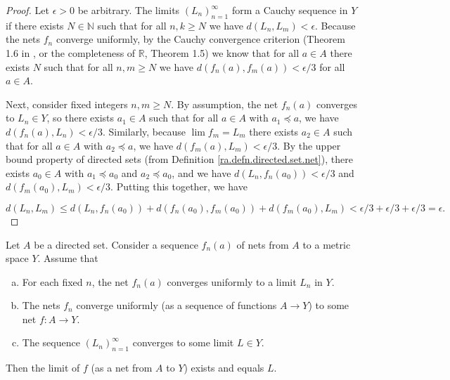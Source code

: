 \begin{proof}

Let \(\epsilon >0\) be arbitrary. The limits \((L_n)_{n=1}^\infty\) form a Cauchy sequence in \(Y\) if there exists \(N \in \mathbb{N}\) such that for all \(n, k \geq N\) we have \(d(L_n, L_m) < \epsilon\). Because the nets \(f_n\) converge uniformly, by the Cauchy convergence criterion (Theorem 1.6 in \citet{pugh2015real}, or the completeness of \(\mathbb{R}\), Theorem 1.5) we know that for all \(a \in A\) there exists \(N\) such that for all \(n, m \geq N\) we have \(d(f_n(a), f_m(a)) < \epsilon/3\) for all \(a \in A\).

Next, consider fixed integers \(n, m \geq N\). By assumption, the net \(f_n(a)\) converges to \(L_n \in Y\), so there exists \(a_1 \in A\) such that for all \(a \in A\) with \(a_1 \preceq a\), we have \(d(f_n(a), L_n) < \epsilon/3\). Similarly, because \(\lim f_m = L_m\) there exists \(a_2 \in A\) such that for all \(a \in A\) with \(a_2 \preceq a\), we have \(d(f_m(a), L_m) < \epsilon/3\). By the upper bound property of directed sets (from Definition \ref{ra.defn.directed.set.net}), there exists \(a_0 \in A\) with \(a_1 \preceq a_0\) and \(a_2 \preceq a_0\), and we have \( d(L_n, f_n(a_0))  < \epsilon/3\) and \(d(f_m(a_0), L_m) < \epsilon/3\). Putting this together, we have

\[
d(L_n, L_m) \leq d(L_n, f_n(a_0)) + d(f_n(a_0), f_m(a_0)) + d(f_m(a_0), L_m) < \epsilon/3 + \epsilon/3 + \epsilon/3 = \epsilon.
\]

\end{proof}


\begin{lemma}\label{ra.425b.hw2.2b.lemma}

Let \(A\) be a directed set. Consider a sequence \(f_n(a)\) of nets from \(A\) to a metric space \(Y\). Assume that

\begin{enumerate}[(a)]

\item For each fixed \(n\), the net \(f_n(a)\) converges uniformly to a limit \(L_n\) in \(Y\).

\item The nets \(f_n\) converge uniformly (as a sequence of functions \(A \to Y\)) to some net \(f: A \to Y\).

\item The sequence \((L_n)_{n=1}^\infty\) converges to some limit \(L \in Y\).

\end{enumerate}

Then the limit of \(f\) (as a net from \(A\) to \(Y\)) exists and equals \(L\).

\end{lemma}

